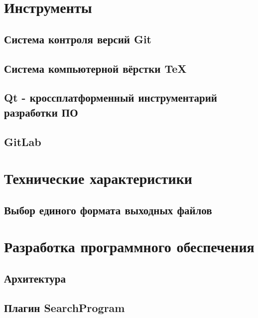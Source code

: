 \section{Инструменты}
\setcounter{figure}{0}
\subsection{Система контроля версий Git}

\subsection{Система компьютерной вёрстки \TeX}

\subsection{Qt - кроссплатформенный инструментарий разработки ПО}

\subsection{GitLab}


\section{Технические характеристики}

\subsection{Выбор единого формата выходных файлов}


\section{Разработка программного обеспечения}
\setcounter{figure}{0}
 
\subsection{Архитектура}


\newpage
\subsection{Плагин SearchProgram}


\newpage
